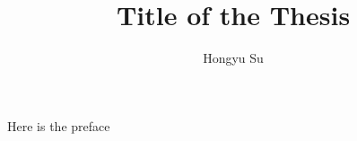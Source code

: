 \documentclass[dissertation]{aaltoseries}
\author{Hongyu Su}
\title{Title of the Thesis}
\begin{document}
\draftabstract{\lipsum[1-3]}
\draftabstract[finnish]{\lipsum[4-6]}
\draftabstract[swedish]{\lipsum[7-9]}

\begin{preface}[Espoo]
	Here is the preface
	\lipsum[1-2]
\end{preface}

\tableofcontents

\listofpublications









\end{document}
